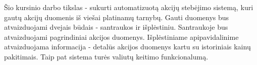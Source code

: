 Šio kursinio darbo tikslas - sukurti automatizuotą akcijų stebėjimo sistemą, kuri gautų akcijų duomenis iš viešai platinamų tarnybų. Gauti duomenys bus atvaizduojami dvejais būdais - santraukos ir išplėstiniu. Santraukoje bus atvaizduojami pagrindiniai akcijos duomenys. Išplėstiniame apipavidalinime atvaizduojama informacija - detalūs akcijos duomenys kartu su istoriniais kainų pakitimais. Taip pat sistema turės valiutų keitimo funkcionalumą. 